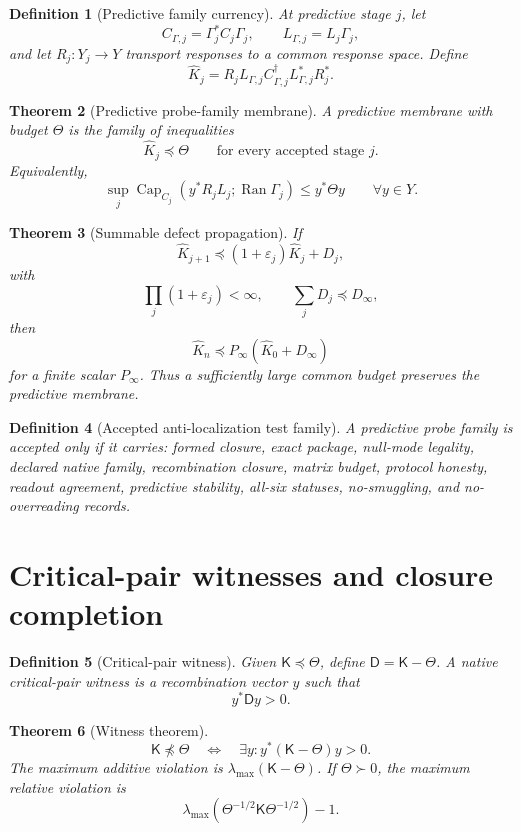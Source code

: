 \documentclass[11pt]{article}
\newtheorem{theorem}{Theorem}[section]
\newtheorem{definition}[theorem]{Definition}
\DeclareMathOperator{\range}{Ran}
\DeclareMathOperator{\Capacity}{Cap}
\newcommand{\K}{\mathsf K}
\newcommand{\Defect}{\mathsf D}
\newcommand{\eps}{\varepsilon}
\begin{document}
\begin{definition}[Predictive family currency]
At predictive stage \(j\), let
\[
  C_{\Gamma,j}=\Gamma_j^*C_j\Gamma_j,
  \qquad L_{\Gamma,j}=L_j\Gamma_j,
\]
and let \(R_j:Y_j\to Y\) transport responses to a common response space.  Define
\[
  \widehat K_j=R_jL_{\Gamma,j}C_{\Gamma,j}^\dagger L_{\Gamma,j}^*R_j^*.
\]
\end{definition}

\begin{theorem}[Predictive probe-family membrane]
A predictive membrane with budget \(\Theta\) is the family of inequalities
\[
  \widehat K_j\preceq\Theta\qquad\text{for every accepted stage }j.
\]
Equivalently,
\[
  \sup_j \Capacity_{C_j}(y^*R_jL_j;\range\Gamma_j)\le y^*\Theta y
  \qquad\forall y\in Y.
\]
\end{theorem}

\begin{theorem}[Summable defect propagation]
If
\[
  \widehat K_{j+1}\preceq(1+\eps_j)\widehat K_j+D_j,
\]
with
\[
  \prod_j(1+\eps_j)<\infty,
  \qquad \sum_jD_j\preceq D_\infty,
\]
then
\[
  \widehat K_n\preceq P_\infty(\widehat K_0+D_\infty)
\]
for a finite scalar \(P_\infty\).  Thus a sufficiently large common budget preserves the predictive membrane.
\end{theorem}

\begin{definition}[Accepted anti-localization test family]
A predictive probe family is accepted only if it carries: formed closure, exact package, null-mode legality, declared native family, recombination closure, matrix budget, protocol honesty, readout agreement, predictive stability, all-six statuses, no-smuggling, and no-overreading records.
\end{definition}

\section{Critical-pair witnesses and closure completion}

\begin{definition}[Critical-pair witness]
Given \(\K\preceq\Theta\), define \(\Defect=\K-\Theta\).  A native critical-pair witness is a recombination vector \(y\) such that
\[
  y^*\Defect y>0.
\]
\end{definition}

\begin{theorem}[Witness theorem]
\[
  \K\npreceq\Theta
  \quad\Longleftrightarrow\quad
  \exists y: y^*(\K-\Theta)y>0.
\]
The maximum additive violation is \(\lambda_{\max}(\K-\Theta)\).  If \(\Theta\succ0\), the maximum relative violation is
\[
  \lambda_{\max}(\Theta^{-1/2}\K\Theta^{-1/2})-1.
\]
\end{theorem}
\end{document}

